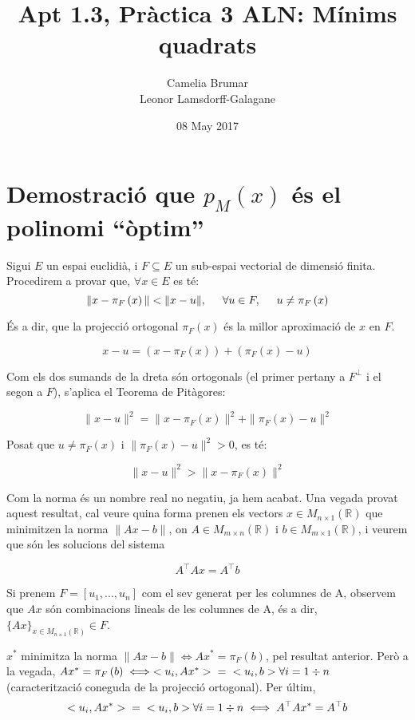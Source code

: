 \documentclass{article}
\title{Apt 1.3, Pràctica 3 ALN: Mínims quadrats}
\author{Camelia Brumar \\ Leonor Lamsdorff-Galagane}
\date{08 May 2017}
\begin{document}
\maketitle

\section{Demostració que $p_{M}(x)$ és el polinomi “òptim”}

Sigui $E$ un espai euclidià, i $F\subseteq E$ un sub-espai vectorial de dimensió finita. Procedirem a provar que, $\forall x \in E$ es té:
$$ \| x - \pi_F\left(x\right) \| < \| x - u \|, \hspace{0.5cm} \forall u \in F, \hspace{0.5cm} u \ne \pi_F\left(x\right) $$

És a dir, que la projecció ortogonal $\pi_F\left(x\right)$ és la millor aproximació de $x$ en $F$.

$$ x - u = \left( x - \pi_F\left(x\right) \right) + \left( \pi_F\left(x\right) - u \right) $$

Com els dos sumands de la dreta són ortogonals (el primer pertany a $F^\perp$ i el segon a $F$), s'aplica el Teorema de Pitàgores: 

$$ \| x - u\|^2 = \| x - \pi_F\left(x\right) \|^2 + \| \pi_F\left(x\right) - u \|^2$$

Posat que $ u \ne \pi_F\left(x\right) $  i  $\| \pi_F\left(x\right) - u \|^2 > 0$, es té:

$$  \| x - u\|^2 > \| x - \pi_F\left(x\right) \|^2  $$

Com la norma és un nombre real no negatiu, ja hem acabat.
Una vegada provat aquest resultat, cal veure quina forma prenen els vectors $ x \in M_{n\times 1} \left( \mathbb{R} \right) $ que minimitzen la norma $ \| Ax - b \| $, on $A\in M_{m\times n} \left( \mathbb{R} \right) $ i $ b \in M_{m\times 1} \left( \mathbb{R} \right)$, i veurem que són  les solucions del sistema

$$ A^\top A x = A^\top b $$

Si prenem $ F = [u_1, ... , u_n ] $ com el sev generat per les columnes de A, observem que $ Ax $ són combinacions lineals de les columnes de A, és a dir, $\{  Ax \}_{x \in M_{n\times 1} \left( \mathbb{R} \right)}\in F$.

$x^*$  minimitza la norma $ \| Ax - b \| \iff Ax^* = \pi_F\left(b\right)$, pel resultat anterior. Però a la vegada, $ Ax^* = \pi_F\left(b\right) \iff <u_i, Ax^*> \hspace{0.2cm} =  \hspace{0.2cm}<u_i,b> \forall i = 1\div n$ (caracterització coneguda de la projecció ortogonal). Per últim, $$  <u_i, Ax^*> \hspace{0.2cm} =  \hspace{0.2cm}<u_i,b> \forall i = 1\div n \iff A^\top Ax^*= A^\top b $$
\end{document}

